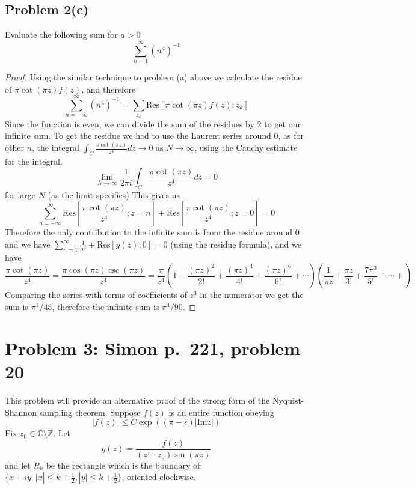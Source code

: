 \documentclass{article}[12pt]
\def\CC{{\mathbb C}}
\def\ZZ{{\mathbb Z}}
\begin{document}
\subsection*{Problem 2(c)} Evaluate the following sum for $a>0$
\[
\sum_{n=1}^\infty (n^4)^{-1}
\]
\begin{proof}
  Using the similar technique to problem (a) above we calculate the residue
  of $\pi\cot(\pi z)f(z)$, and therefore
  \[
  \sum_{n=-\infty}^\infty (n^4)^{-1} = \sum_{z_k} \mbox{Res} [\pi\cot(\pi z)f(z); z_k]
  \]
  Since the function is even, we can divide the sum of the residues by 2 to
  get our infinite sum. To get the residue we had to use the Laurent series
  around 0, as for other $n$, the integral $\int_C \frac{\pi \cot(\pi z)}{z^4}dz \to 0$
  as $N\to\infty$, using the Cauchy estimate for the integral.
  \[
  \lim_{N\to\infty} \frac{1}{2\pi i} \int_C \frac{\pi \cot(\pi z)}{z^4} dz = 0
  \]
  for large $N$ (as the limit specifies)
  This gives us
  \[
  \sum_{n=-\infty}^\infty \mbox{Res}[\frac{\pi \cot(\pi z)}{z^4}; z=n] +
  \mbox{Res}[\frac{\pi\cot(\pi z)}{z^4}; z=0] = 0
  \]
  Therefore the
  only contribution to the infinite sum is from the residue around 0
  and we have $\sum_{n=1}^\infty \frac{1}{n^4} + \mbox{Res} [g(z);0] = 0$ (using
  the residue formula),
  and we have
  \[
  \frac{\pi \cot(\pi z)}{z^4} = \frac{\pi \cos(\pi z)\csc(\pi z)}{z^4} =
  \frac{\pi}{z^4}\left( 1-\frac{(\pi z)^2}{2!} +\frac{(\pi z)^4}{4!} + 
  \frac{(\pi z)^6}{6!}
  +\cdots\right)
  \left(\frac{1}{\pi z} + \frac{\pi z}{3!}+\frac{7\pi^3}{5!}+\cdots+\right)
    \]
    Comparing the series with terms of coefficients of $z^3$ in the numerator we get
    the sum is $\pi^4/45$, therefore the infinite sum is $\pi^4/90$.
\end{proof}

\section*{Problem 3: Simon p.~221, problem 20}
 This problem will provide an alternative
proof of the strong form of the Nyquist-Shannon sampling theorem.
Suppose $f(z)$ is an entire function obeying
\[
|f(z)| \le C \exp((\pi-\epsilon)|\mbox{Im}z|)
\]
Fix $z_0\in \CC\setminus \ZZ$. Let
\[
g(z)=\frac{f(z)}{(z-z_0)\sin(\pi z)}
\]
and let $R_k$ be the rectangle which is the boundary 
of $\{x+iy|\ |x|\le k+\frac{1}{2}, |y|\le k+\frac{1}{2}\}$, oriented
clockwise.
\end{document}

